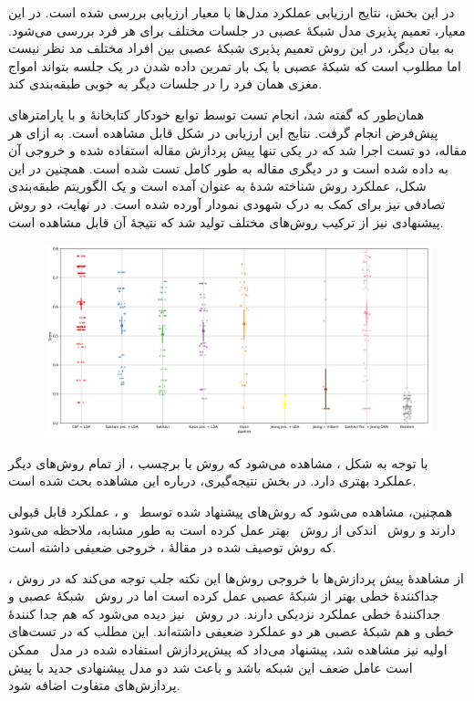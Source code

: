 در این بخش، نتایج ارزیابی عملکرد مدل‌ها با معیار ارزیابی  بررسی شده است. در این معیار، تعمیم پذیری مدل شبکهٔ عصبی در جلسات مختلف برای هر فرد بررسی می‌شود. به بیان دیگر، در این روش تعمیم پذیری شبکهٔ عصبی بین افراد مختلف مد نظر نیست اما مطلوب است که شبکهٔ عصبی با یک بار تمرین داده شدن در یک جلسه بتواند امواج مغزی همان فرد را در جلسات دیگر به خوبی طبقه‌بندی کند.

همان‌طور که گفته شد، انجام تست  توسط توابع خودکار کتابخانهٔ  و با پارامترهای پیش‌فرض انجام گرفت. نتایج این ارزیابی در شکل  قابل مشاهده است. به ازای هر مقاله، دو تست اجرا شد که در یکی تنها پیش پردازش مقاله استفاده شده و خروجی آن به  داده شده است و در دیگری مقاله به طور کامل تست شده است. همچنین در این شکل، عملکرد روش شناخته شدهٔ  به عنوان  آمده است و یک الگوریتم طبقه‌بندی تصادفی نیز برای کمک به درک شهودی نمودار آورده شده است. در نهایت، دو روش پیشنهادی نیز از ترکیب روش‌های مختلف تولید شد که نتیجهٔ آن قابل مشاهده است.

\begin{figure}
\centering
\includegraphics[width=23cm]{img/fig-bar.png}
\end{figure}

با توجه به شکل ، مشاهده می‌شود که روش  با برچسب ، از تمام روش‌های دیگر عملکرد بهتری دارد. در بخش نتیجه‌گیری، درباره این مشاهده بحث شده است.

همچنین، مشاهده می‌شود که روش‌های پیشنهاد شده توسط \آ\ و \ب، عملکرد قابل قبولی دارند و روش \ب\ اندکی از روش \آ\ بهتر عمل کرده است به طور مشابه، ملاحظه می‌شود که روش توصیف شده در مقالهٔ \پ، خروجی ضعیفی داشته است.

از مشاهدهٔ پیش پردازش‌ها با خروجی روش‌ها این نکته جلب توجه می‌کند که در روش \آ، جداکنندهٔ خطی بهتر از شبکهٔ عصبی عمل کرده است اما در روش \ب\ شبکهٔ عصبی و جداکنندهٔ خطی عملکرد نزدیکی دارند. در روش \پ\ نیز دیده می‌شود که هم جدا کنندهٔ خطی و هم شبکهٔ عصبی هر دو عملکرد ضعیفی داشته‌اند. این مطلب که در تست‌های اولیه نیز مشاهده شد، پیشنهاد می‌داد که پیش‌پردازش استفاده شده در مدل \پ\ ممکن است عامل ضعف این شبکه باشد و باعث شد دو مدل پیشنهادی جدید با پیش پردازش‌های متفاوت اضافه شود.

